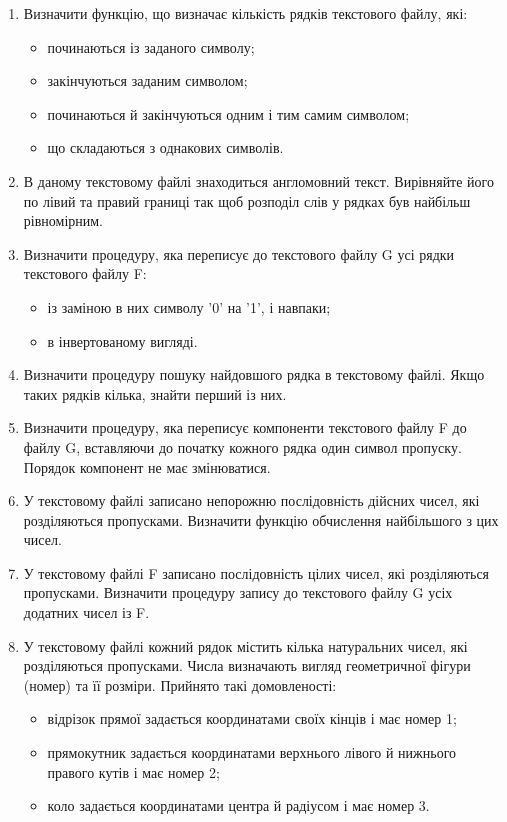 \documentclass[a5paper,titlepage,openany,twoside,draft]{book_unv}%
\begin{document}
\begin{enumerate}
\item
Визначити функцію, що визначає кількість рядків текстового файлу,
які:
\begin{itemize}
\item починаються із заданого символу;
\item закінчуються заданим символом;
\item починаються й закінчуються одним і тим самим символом;
\item що складаються з однакових символів.
\end{itemize}

\item
В даному текстовому файлі знаходиться англомовний текст. Вирівняйте
його по лівий та правий границі так щоб розподіл слів у рядках був
найбільш рівномірним.

\item
Визначити процедуру, яка переписує до текстового файлу G усі 
рядки текстового файлу F:
\begin{itemize}
\item із заміною в них символу '0' на '1', і навпаки;
\item в інвертованому вигляді.
\end{itemize}

\item
Визначити процедуру пошуку найдовшого рядка в текстовому файлі.
Якщо таких рядків кілька, знайти перший із них.
\item
Визначити процедуру, яка переписує компоненти текстового 
файлу F до файлу G, вставляючи до початку кожного рядка один символ пропуску.
Порядок компонент не має змінюватися.
\item
У текстовому файлі записано непорожню послідовність дійсних чисел,
які розділяються пропусками. Визначити функцію обчислення найбільшого з
цих чисел.

\item
У текстовому файлі F записано послідовність цілих чисел, які розділяються пропусками. 
Визначити процедуру запису до текстового файлу G усіх додатних чисел із F.

\item
У текстовому файлі кожний рядок містить кілька натуральних чисел, які розділяються пропусками.
Числа визначають вигляд геометричної фігури (номер) та її розміри. Прийнято такі домовленості:
\begin{itemize}
\item
відрізок прямої задається координатами своїх кінців і має номер 1;
\item
прямокутник задається координатами верхнього лівого й нижнього правого кутів і має номер 2;
\item
коло задається координатами центра й радіусом і має номер 3.
\end{itemize}


\end{enumerate}
\end{document}
